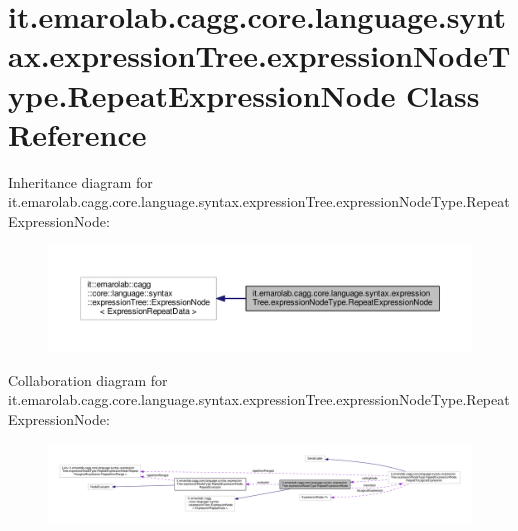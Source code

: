 \hypertarget{classit_1_1emarolab_1_1cagg_1_1core_1_1language_1_1syntax_1_1expressionTree_1_1expressionNodeType_1_1RepeatExpressionNode}{\section{it.\-emarolab.\-cagg.\-core.\-language.\-syntax.\-expression\-Tree.\-expression\-Node\-Type.\-Repeat\-Expression\-Node Class Reference}
\label{classit_1_1emarolab_1_1cagg_1_1core_1_1language_1_1syntax_1_1expressionTree_1_1expressionNodeType_1_1RepeatExpressionNode}
}


Inheritance diagram for it.\-emarolab.\-cagg.\-core.\-language.\-syntax.\-expression\-Tree.\-expression\-Node\-Type.\-Repeat\-Expression\-Node\-:\nopagebreak
\begin{figure}[H]
\begin{center}
\leavevmode
\includegraphics[width=350pt]{classit_1_1emarolab_1_1cagg_1_1core_1_1language_1_1syntax_1_1expressionTree_1_1expressionNodeTypcbec70e1955bcfb611c1a326eeb922e8}
\end{center}
\end{figure}


Collaboration diagram for it.\-emarolab.\-cagg.\-core.\-language.\-syntax.\-expression\-Tree.\-expression\-Node\-Type.\-Repeat\-Expression\-Node\-:\nopagebreak
\begin{figure}[H]
\begin{center}
\leavevmode
\includegraphics[width=350pt]{classit_1_1emarolab_1_1cagg_1_1core_1_1language_1_1syntax_1_1expressionTree_1_1expressionNodeTyp6634558e4ed11745a30ee41a9edbca94}
\end{center}
\end{figure}
